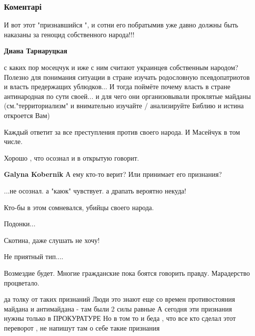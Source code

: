  
 
 
 
 
\subsubsection{Коментарі}
\label{sec:17_04_2021.fb.fb_group.titarenko_vremja_mira.1.mosijchuk_priznanie.cmt}

\begin{itemize} %
И вот этот "признавшийся ", и сотни его побратымив уже давно должны быть наказаны за геноцид собственного народа!!!

\begin{itemize} %
\textbf{Диана Тарнаруцкая} 

с каких пор мосецчук и иже с ним считают украинцев собственным народом? Полезно
для понимания ситуации в стране изучать родословную псевдопатриотов и власть
предержащих ублюдков... И тогда поймёте почему власть в стране антинародная по
сути своей... и для чего они организовывали проклятые майданы
(см."территориализм" и внимательно изучайте / анализируйте Библию и истина
откроется Вам)

\end{itemize} %

Каждый ответит за все преступления против своего народа. И Масейчук в том числе.

Хорошо , что осознал и в открытую говорит.

\begin{itemize} %
\textbf{Galyna Kobernik} А ему кто-то верит? Или принимает его признания?

...не осознал. а "каюк" чувствует. а драпать вероятно некуда!
\end{itemize} %

Кто-бы в этом сомневался, убийцы своего народа.

Подонки...

Скотина, даже слушать не хочу!

Не приятный тип....

Возмездие будет. Многие гражданские пока боятся говорить правду. Марадерство процветало.


да толку от таких признаний Люди это знают еще со времен противостояния майдана
и антимайдана - там были 2 силы равные А сегодня эти признания нужны только в
ПРОКУРАТУРЕ Но в том то и беда , что все кто сделал этот переворот , не напишут
там о себе такие признания

\end{itemize} %
